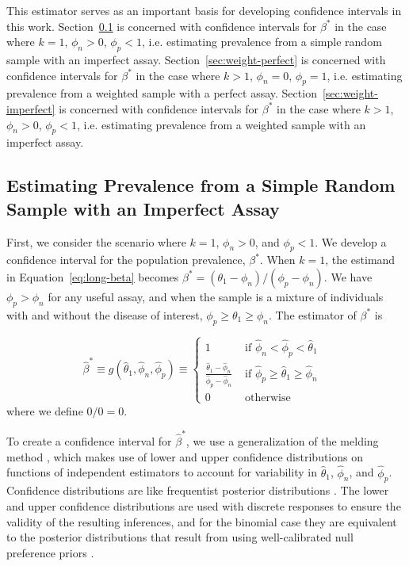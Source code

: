 \documentclass[AMA,STIX1COL]{WileyNJD-v2}
\begin{document}
This estimator serves as an important basis for developing confidence intervals in this work.
Section~\ref{sec:srs-imperfect} is concerned with confidence intervals for  \( \beta^* \) in the case where \( k = 1 \), \( \phi_n > 0 \), \( \phi_p < 1 \), i.e. estimating prevalence from a simple random sample with an imperfect assay.
Section~\ref{sec:weight-perfect} is concerned with confidence intervals for  \( \beta^* \) in the case where \( k > 1 \), \( \phi_n = 0 \), \( \phi_p = 1 \), i.e. estimating prevalence from a weighted sample with a perfect assay.
Section~\ref{sec:weight-imperfect} is concerned with confidence intervals for  \( \beta^* \) in the case where \( k > 1 \), \( \phi_n > 0 \), \( \phi_p < 1 \), i.e. estimating prevalence from a weighted sample with an imperfect assay.

\subsection{Estimating Prevalence from a Simple Random Sample with an Imperfect Assay}
\label{sec:srs-imperfect}

First, we consider the scenario where \( k = 1 \), \( \phi_n > 0 \), and \( \phi_p < 1 \).
We develop a confidence interval for the population prevalence, \( \beta^* \).
When \( k = 1 \), the estimand in Equation~\ref{eq:long-beta} becomes $\beta^* = (\theta_1 - \phi_n)/(\phi_p-\phi_n)$. We have $\phi_p > \phi_n$ for any useful assay, and when the sample is a mixture of individuals with and without the disease of interest, $\phi_p \geq \theta_1 \geq \phi_n$. The estimator of $\beta^*$ is 

\begin{equation}
\hat{\beta}^* \equiv 
g(\hat{\theta}_1, \hat{\phi}_n, \hat{\phi}_p)
\equiv 
\left\{ 
\begin{array}{ll}
1 & \mbox{ if $\hat{\phi}_n < \hat{\phi}_p < \hat{\theta}_1$ }  \\
\frac{\hat{\theta}_1 - \hat{\phi}_n}{\hat{\phi}_p - \hat{\phi}_n} & 
\mbox{ if $\hat{\phi}_p \geq \hat{\theta}_1 \geq \hat{\phi}_n$ } \\
0 & \mbox{ otherwise} 
\end{array}
\right.
\label{eq:srs-beta-est}
\end{equation}
where we define $0/0=0$.



To create a confidence interval for \( \hat{\beta}^* \), we use a generalization of the melding method \cite{FayP:2015}, which makes use of lower and upper confidence distributions on functions of independent estimators to account for variability in \( \hat{\theta}_1 \), \( \hat{\phi}_n \), and \( \hat{\phi}_p \). Confidence distributions are like frequentist posterior distributions
\cite{}.  The lower and upper confidence distributions are used with discrete responses to ensure the validity of the resulting inferences, and for the binomial case they are equivalent to the posterior distributions that result from using well-calibrated null preference priors \cite{}.
\end{document}

